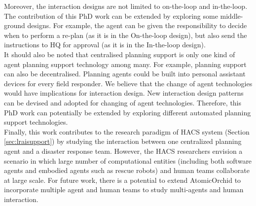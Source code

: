 Moreover, the interaction designs are not limited to on-the-loop and in-the-loop. The contribution of this PhD work can be extended by exploring some middle-ground designs. For example, the agent can be given the responsibility to decide when to perform a re-plan (as it is in the On-the-loop design), but also send the instructions to HQ for approval (as it is in the In-the-loop design).\\

It should also be noted that centralised planning support is only one kind of agent planning support technology among many. For example, planning support can also be decentralised. Planning agents could be built into personal assistant devices for every field responder. We believe that the change of agent technologies would have implications for interaction design. New interaction design patterns can be devised and adopted for changing of agent technologies. Therefore, this PhD work can potentially be extended by exploring different automated planning support technologies.\\ 

Finally, this work contributes to the research paradigm of \acf{HACS} system (Section \ref{sec:lraisupport}) by studying the interaction between one centralized planning agent and a disaster response team. However, the \ac{HACS} researchers envision a scenario in which large number of computational entities (including both software agents and embodied agents such as rescue robots) and human teams collaborate at large scale. For future work, there is a potential to extend AtomicOrchid to incorporate multiple agent and human teams to study multi-agents and human interaction.\\




